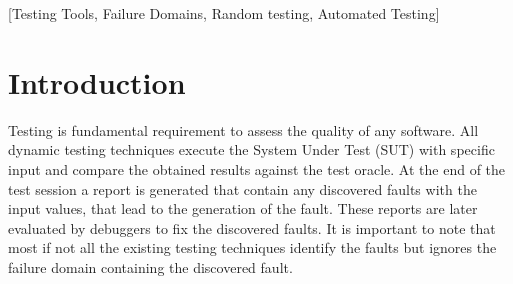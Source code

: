 \documentclass{acm_proc_article-sp}
\begin{document}
\maketitle
\begin{abstract}
Many research studies in the random testing literature refer to 
point, block and strip fault domains across the input domain of a system.
A number of new strategies have also been devised on this principle claiming better results.
However, no study was conducted to graphically show their existence
and the frequency of each faulty domain in real production application. 

In this research we study fault domains and check to which type of domains they belong. 
Our experimental results show that in 60\%  cases faults form point domain, 
while block and strip domain form 20\% each. We also checked what relation exists 
between fault domains traced back to only one fault: are they contiguous, separate, or marginally adherent. 

This study allows for a better understanding of fault domains and assumptions made on the 
strategies for testing code. We applied our results by correlating our study with three random strategies: random, random+ and DSSR. 

\end{abstract}

[Testing Tools, Failure Domains, Random testing, Automated Testing]

\section{Introduction}

Testing is fundamental requirement to assess the quality of any software.
All dynamic testing techniques execute the System Under Test (SUT) with specific input 
and compare the obtained results against the test oracle. At the end of the test session a report is generated that contain any 
discovered faults with the input values, that lead to the generation of the fault. These reports are later evaluated by
debuggers to fix the discovered faults. It is important to note that most if not all the existing testing 
techniques identify the faults but ignores the failure domain containing the discovered fault.\\

\end{document}
